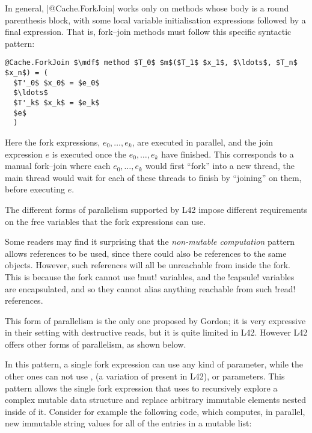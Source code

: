 In general, \Q|@Cache.ForkJoin| works only on methods whose body is a round parenthesis block, with some local variable initialisation expressions followed by a final expression.
That is, fork--join methods must follow this specific syntactic pattern:
\begin{lstlisting}[deletekeywords=label]
@Cache.ForkJoin $\mdf$ method $T_0$ $m$($T_1$ $x_1$, $\ldots$, $T_n$ $x_n$) = (
  $T'_0$ $x_0$ = $e_0$
  $\ldots$
  $T'_k$ $x_k$ = $e_k$
  $e$
  )
\end{lstlisting}
Here the fork expressions, $e_0,\ldots,e_k$, are executed in parallel, and the join expression $e$ is executed once the $e_0,\ldots,e_k$ have finished.
This corresponds to a manual fork--join where each $e_0,\ldots,e_k$ would first ``fork'' into a new thread, the main thread would wait for each of these threads to finish by ``joining'' on them, before executing $e$.

The different forms of parallelism supported by L42 impose different requirements on the free variables that the fork expressions can use.

Some readers may find it surprising that the \emph{non-mutable computation} pattern allows \Q@read@ references to be used, since there could also be \Q@mut@ references to the same objects.
However, such \Q@mut@ references will all be unreachable from inside the fork. This is because the fork cannot use \Q!mut! variables, and the \Q!capsule! variables are encapsulated, and so they cannot alias anything reachable from such \Q!read! references.

This form of parallelism is the only one proposed by Gordon; it is very expressive in their setting with destructive reads, but it is quite limited in L42. However L42 offers other forms of parallelism, as shown below.



In this pattern, a single fork expression can use any kind of parameter, while the other ones can not 
use \Q@mut@, \Q@lent@ (a variation of \Q@mut@ present in L42), or \Q@read@ parameters.
This pattern allows the single fork expression that uses \Q@mut@ to recursively explore a complex mutable data structure and replace arbitrary immutable elements nested inside of it.
Consider for example the following code, which computes, in parallel,
new immutable string values for all of
the entries in a mutable list:

